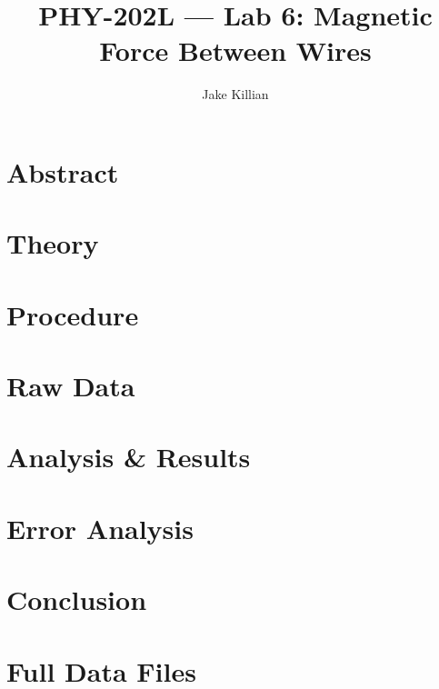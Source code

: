 \documentclass[11pt]{article}
\title{PHY-202L — Lab 6: Magnetic Force Between Wires}
\author{Jake Killian}
\date{}
\begin{document}
\maketitle

\section{Abstract}

\section{Theory}

\section{Procedure}

\section{Raw Data}

\section{Analysis \& Results}

\section{Error Analysis}

\section{Conclusion}

\appendix
\section{Full Data Files}
\end{document}
